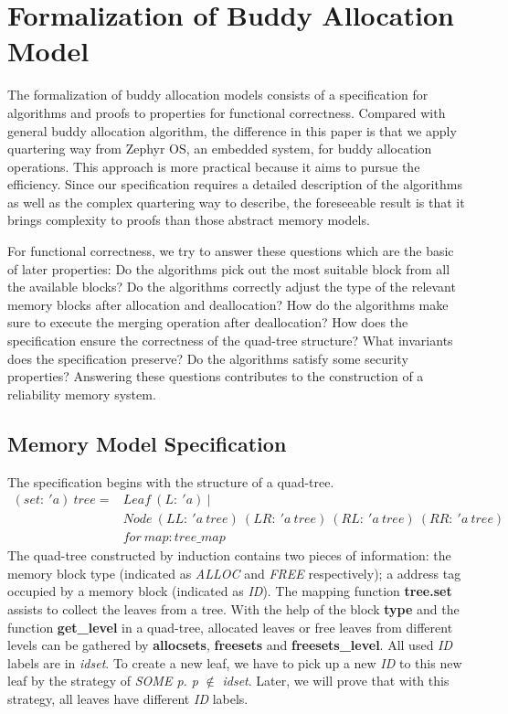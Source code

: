 \section{Formalization of Buddy Allocation Model}
The formalization of buddy allocation models consists of a specification for algorithms and proofs to properties for functional correctness. Compared with general buddy allocation algorithm, the difference in this paper is that we apply quartering way from Zephyr OS, an embedded system, for buddy allocation operations. This approach is more practical because it aims to pursue the efficiency. Since our specification requires a detailed description of the algorithms as well as the complex quartering way to describe, the foreseeable result is that it brings complexity to proofs than those abstract memory models.

For functional correctness, we try to answer these questions which are the basic of later properties: Do the algorithms pick out the most suitable block from all the available blocks? Do the algorithms correctly adjust the type of the relevant memory blocks after allocation and deallocation? How do the algorithms make sure to execute the merging operation after deallocation? How does the specification ensure the correctness of the quad-tree structure? What invariants does the specification preserve? Do the algorithms satisfy some security properties? Answering these questions contributes to the construction of a reliability memory system.

\subsection{Memory Model Specification}
The specification begins with the structure of a quad-tree.
\begin{align*}
(set:\ 'a)\ tree = &Leaf\ (L:\ 'a)\ | \\
&Node\ (LL:\ 'a\ tree)\ (LR:\ 'a\ tree)\ (RL:\ 'a\ tree)\ (RR:\ 'a\ tree) \\
&for\ map: tree\_map
\end{align*}
The quad-tree constructed by induction contains two pieces of information: the memory block type (indicated as \emph{ALLOC} and \emph{FREE} respectively); a address tag occupied by a memory block (indicated as \emph{ID}). The mapping function \textbf{tree.set} assists to collect the leaves from a tree. With the help of the block \textbf{type} and the function \textbf{get\_level} in a quad-tree, allocated leaves or free leaves from different levels can be gathered by \textbf{allocsets}, \textbf{freesets} and \textbf{freesets\_level}. All used \emph{ID} labels are in \emph{idset}. To create a new leaf, we have to pick up a new \emph{ID} to this new leaf by the strategy of \emph{SOME p. p} $\notin$ \emph{idset}. Later, we will prove that with this strategy, all leaves have different \emph{ID} labels.

